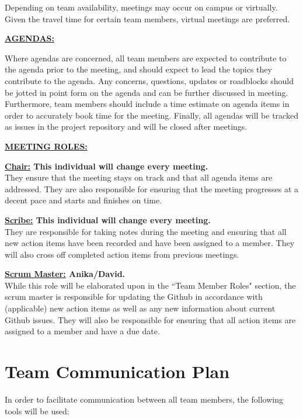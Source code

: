 \documentclass{article}
\begin{document}
Depending on team availability, meetings may occur on campus or virtually. 
Given the travel time for certain team members, virtual meetings are preferred.

\noindent \textbf{\underline{AGENDAS:}}

Where agendas are concerned, all team members are expected to contribute to the agenda prior to the meeting, 
and should expect to lead the topics they contribute to the agenda. 
Any concerns, questions, updates or roadblocks should be jotted in point form on the agenda and can be further discussed in meeting. 
Furthermore, team members should include a time estimate on agenda items in order to accurately book time for the meeting.
Finally, all agendas will be tracked as issues in the project repository and will be closed after meetings.

\noindent \textbf{\underline{MEETING ROLES:}}

\noindent \textbf{\underline{Chair:} This individual will change every meeting. } \\
\noindent They ensure that the meeting stays on track and that all agenda items are addressed. 
They are also responsible for ensuring that the meeting progresses at a decent pace and starts and finishes on time.

\noindent \textbf{\underline{Scribe:} This individual will change every meeting.} \\
\noindent They are responsible for taking notes during the meeting and ensuring that 
all new action items have been recorded and have been assigned to a member.
They will also cross off completed action items from previous meetings.

\noindent \textbf{\underline{Scrum Master:} Anika/David.} \\
\noindent While this role will be elaborated upon in the ``Team Member Roles" section, the scrum master 
is responsible for updating the Github in accordance with (applicable) new action items 
as well as any new information about current Github issues.
They will also be responsible for ensuring that all action items are assigned to a member and have a due date.



\section{Team Communication Plan}
In order to facilitate communication between all team members, the following tools will be used:
\end{document}
